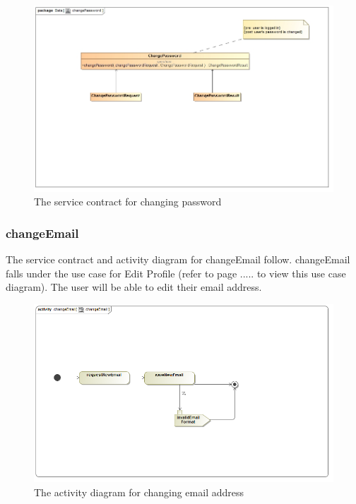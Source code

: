 \documentclass[a4paper,12pt]{article}
\begin{document}
\begin{figure}[H]
	\centering
	\includegraphics[width=1.0\textwidth]{images/changePasswordSC.jpg}
	\caption{The service contract for changing password}
\end{figure}

\subsubsection{changeEmail}
The service contract and activity diagram for changeEmail follow. changeEmail falls under the use case for Edit Profile (refer to page ..... to view this use case diagram). The user will be able to edit their email address.
\begin{figure}[H]
  \centering
    \includegraphics[width=1.0\textwidth]{images/changeEmail.png} 
    \caption{The activity diagram for changing email address}
\end{figure}
	
\end{document}
